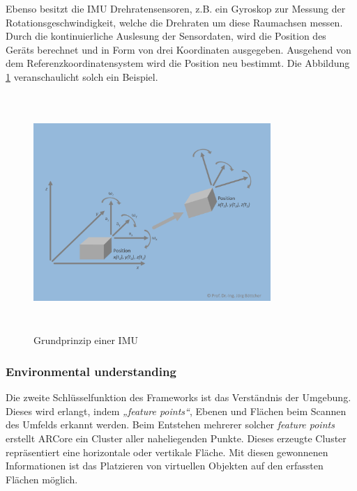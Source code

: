 Ebenso besitzt die \acs{IMU} Drehratensensoren, z.B. ein Gyroskop zur Messung der Rotationsgeschwindigkeit, welche die Drehraten um 
diese Raumachsen messen. Durch die kontinuierliche Auslesung der Sensordaten, wird die Position des Geräts berechnet und in Form von 
drei Koordinaten ausgegeben. Ausgehend von dem Referenzkoordinatensystem wird die Position neu bestimmt. Die Abbildung \ref{pic:Positionsberechnung} 
veranschaulicht solch ein Beispiel.
\begin{figure}[hbt!]
    \centering
    \includegraphics[width=9cm,height=9cm,keepaspectratio]{2Grundlagen/Bilder/imu-Bsp.png}
    \caption{Grundprinzip einer IMU \cite{imubild.2020j}}
    \label{pic:Positionsberechnung}
\end{figure}
\pagebreak
\subsubsection*{Environmental understanding}
Die zweite Schlüsselfunktion des Frameworks ist das Verständnis der Umgebung. Dieses wird erlangt, indem \textit{„feature points“}, Ebenen und 
Flächen beim Scannen des Umfelds erkannt werden. Beim Entstehen mehrerer solcher \textit{feature points} erstellt ARCore ein Cluster aller 
naheliegenden Punkte. Dieses erzeugte Cluster repräsentiert eine horizontale oder vertikale Fläche. Mit diesen gewonnenen Informationen ist das 
Platzieren von virtuellen Objekten auf den erfassten Flächen möglich. \cite{arcoreofficial.2020j}
